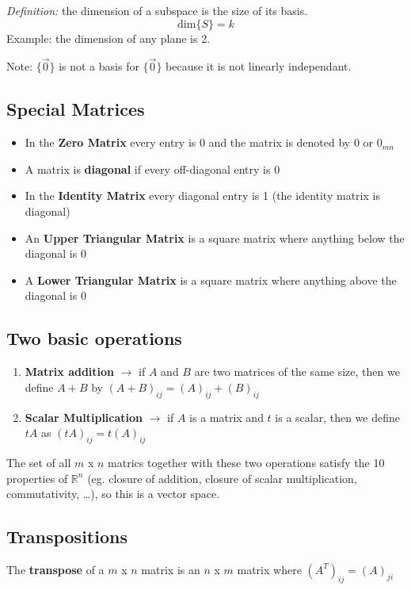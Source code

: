 \documentclass[12pt]{article}
\newcommand{\R}[1]{\mathbb{R}^{#1}}
\begin{document}

\textit{Definition:} the dimension of a subspace is the size of its basis. \[ \text{dim}\{S\} = k \]
Example: the dimension of any plane is 2.

Note: $\{\vec{0}\}$ is not a basis for $\{\vec{0}\}$ because it is not linearly independant.

\subsection*{Special Matrices}
\begin{itemize}
\item In the {\bf Zero Matrix} every entry is 0 and the matrix is denoted by 0 or $0_{mn}$
\item A matrix is {\bf diagonal} if every off-diagonal entry is 0
\item In the {\bf Identity Matrix} every diagonal entry is 1 (the identity matrix is diagonal)
\item An {\bf Upper Triangular Matrix} is a square matrix where anything below the diagonal is 0
\item A {\bf Lower Triangular Matrix} is a square matrix where anything above the diagonal is 0
\end{itemize}

\subsection*{Two basic operations}
\begin{enumerate}
\item {\bf Matrix addition} $\rightarrow$ if $A$ and $B$ are two matrices of the same size, then we define $A + B$ by $(A + B)_{ij} = (A)_{ij} + (B)_{ij}$
\item {\bf Scalar Multiplication} $\rightarrow$ if $A$ is a matrix and $t$ is a scalar, then we define $tA$ as $(tA)_{ij} = t(A)_{ij}$
\end{enumerate}

The set of all $m$ x $n$ matrics together with these two operations satisfy the 10 properties of $\R{n}$ (eg. closure of addition, closure of scalar multiplication, commutativity, \dots ), so this is a vector space.

\subsection*{Transpositions}
The {\bf transpose} of a $m$ x $n$ matrix is an $n$ x $m$ matrix where $(A^T)_{ij} = (A)_{ji}$
\end{document}
